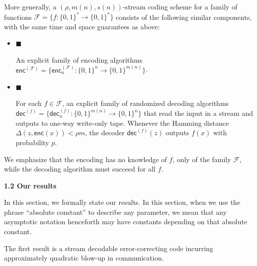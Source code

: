\documentclass[10pt,a4paper]{article}
\begin{document}
More generally, a $(\rho,m(n),s(n))$-stream coding scheme for a family of functions $\mathcal{F}=\{f:\{0,1\}^{*}\to\{0,1\}^{*}\}$ consists of the following similar components, with the same time and space guarantees as above:\par


\begin{itemize}


\item[] 
$\blacksquare$ 


An explicit family of encoding algorithms $\mathsf{enc}^{(\mathcal{F})}=\{\mathsf{enc}^{(\mathcal{F})}_{n}:\{0,1\}^{n}\rightarrow\{0,1\}^{m(n)}\}$.\par





\item[] 
$\blacksquare$ 


For each $f\in\mathcal{F}$, an explicit family of randomized decoding algorithms $\mathsf{dec}^{(f)}=\{\mathsf{dec}^{(f)}_{n}:\{0,1\}^{m(n)}\rightarrow\{0,1\}^{n}\}$ that read the input in a stream and outputs to one-way write-only tape. Whenever the Hamming distance $\Delta(z,\mathsf{enc}(x))<\rho m$, the decoder $\mathsf{dec}^{(f)}(z)$ outputs $f(x)$ with probability $p$.\par





\end{itemize}


We emphasize that the encoding has no knowledge of $f$, only of the family $\mathcal{F}$, while the decoding algorithm must succeed for all $f$.\par





\par\medskip\noindent\textbf{
1.2 Our results}\par




In this section, we formally state our results. In this section, when we use the phrase “absolute constant” to describe any parameter, we mean that any asymptotic notation henceforth may have constants depending on that absolute constant.\par




The first result is a stream decodable error-correcting code incurring approximately quadratic blow-up in communication.\par
\end{document}
